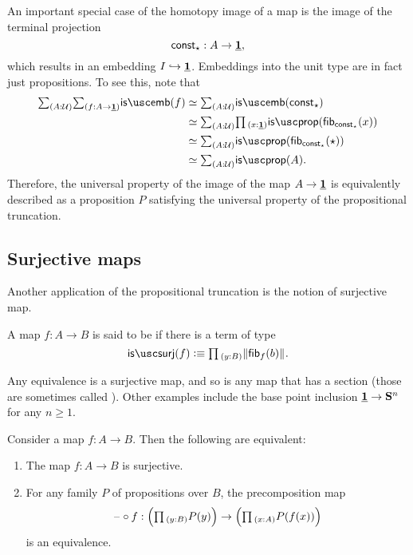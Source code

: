 \begin{eg}
  An important special case of the homotopy image of a map is the image of the terminal projection
\begin{equation*}
  \mathsf{const}_\star : A \to \underline{\mathbf{1}},
\end{equation*}
which results in an embedding $I\hookrightarrow \underline{\mathbf{1}}$. Embeddings into the unit type are in fact just propositions. To see this, note that
\begin{align*}
\sm{A:\UU}{f:A\to\unit}\isemb(f)
& \eqvsym \sm{A:\UU}\isemb(\const_\ttt) \\
& \eqvsym \sm{A:\UU}\prd{x:\unit}\isprop(\fib{\const_\ttt}{x}) \\
& \eqvsym \sm{A:\UU}\isprop(\fib{\const_\ttt}{\ttt}) \\
& \eqvsym \sm{A:\UU}\isprop(A).
\end{align*}
Therefore, the universal property of the image of the map $A\to\underline{\mathbf{1}}$ is equivalently described as a proposition $P$ satisfying the universal property of the propositional truncation.
\end{eg}

\subsection{Surjective maps}

Another application of the propositional truncation is the notion of surjective map.

\begin{defn}
A map $f:A\to B$ is said to be  if there is a term of type
\begin{equation*}
\issurj(f)\defeq \prd{y:B}\brck{\fib{f}{b}}.
\end{equation*}
\end{defn}

\begin{eg}
Any equivalence is a surjective map, and so is any map that has a section (those are sometimes called ). Other examples include the base point inclusion $\underline{\mathbf{1}}\to\mathbf{S}^{n}$ for any $n\geq 1$. 
\end{eg}

\begin{prp}\label{prp:surjective}
  Consider a map $f:A\to B$. Then the following are equivalent:
  \begin{enumerate}
  \item The map $f:A\to B$ is surjective.
  \item For any family $P$ of propositions over $B$, the precomposition map
    \begin{equation*}
      \blank\circ f : \Big(\prd{y:B}P(y)\Big)\to\Big(\prd{x:A}P(f(x))\Big)
    \end{equation*}
    is an equivalence.
  \end{enumerate}
\end{prp}

